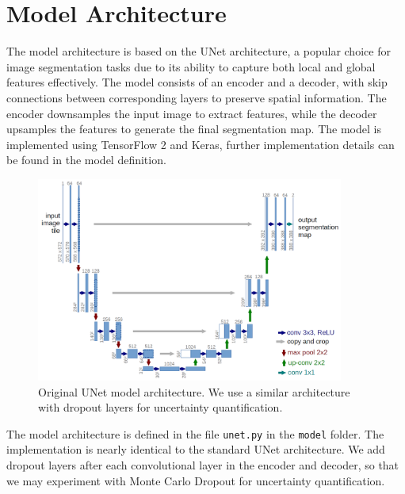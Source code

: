 \documentclass{article}
\begin{document}
\section{Model Architecture}
The model architecture is based on the UNet architecture, a popular choice for image segmentation tasks
due to its ability to capture both local and global features effectively. The model consists of an encoder
and a decoder, with skip connections between corresponding layers to preserve spatial information. The
encoder downsamples the input image to extract features, while the decoder upsamples the features to
generate the final segmentation map. The model is implemented using TensorFlow 2 and Keras, further
implementation details can be found in the model definition.

\begin{figure}[h]
    \centering
    \includegraphics[width=0.9\textwidth]{../images/unet.png}
    \caption{Original UNet model architecture. We use a similar architecture with dropout layers for uncertainty quantification.} 
    \label{fig:unet_architecture}
\end{figure}
\vspace{1em}

The model architecture is defined in the file \texttt{unet.py} in the \texttt{model} folder. The implementation
is nearly identical to the standard UNet architecture. We add dropout layers after each convolutional layer
in the encoder and decoder, so that we may experiment with Monte Carlo Dropout for uncertainty quantification.

\end{document}
